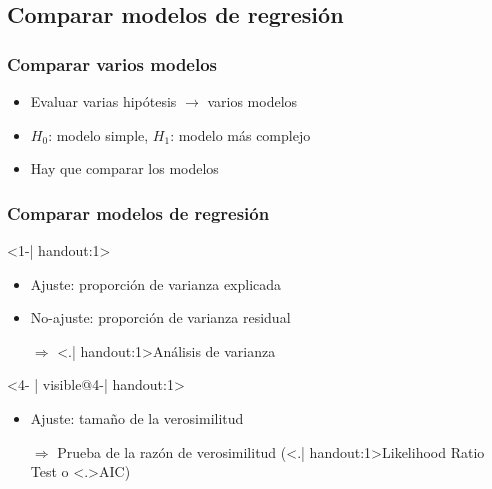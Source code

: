 \documentclass[gray,handout,mathserif]{beamer}
\begin{document}
 
\subsection[Comparaci\'on de modelos]{Comparar modelos de regresi\'on}

\begin{frame}[label=modelcompar]
   \frametitle{Comparar varios modelos}
    \begin{itemize}
      \item Evaluar varias hip\'otesis $\rightarrow$ varios modelos
      \item $H_0$: modelo simple, $H_1$: modelo m\'as complejo
      \item Hay que comparar los modelos
   \end{itemize}
\end{frame}%


\begin{frame}[label=compregrmod1]
   \frametitle{Comparar modelos de regresi\'on}
   \begin{block}{}<1-| handout:1>
      \begin{itemize}[<+-| handout:1>]
         \item Ajuste: proporci\'on de varianza explicada
         \item No-ajuste: proporci\'on de varianza residual
         \item[$\Rightarrow$] \alert<.| handout:1>{An\'alisis de varianza}
      \end{itemize}
   \end{block}
   \begin{block}{}<4- | visible@4-| handout:1>
      \begin{itemize}[<+-| handout:1>]
         \item Ajuste: tama\~no de la verosimilitud
         \item[$\Rightarrow$] Prueba de la raz\'on de verosimilitud (\alert<.| handout:1>{Likelihood Ratio Test} o \alert<.>{AIC})
      \end{itemize}
   \end{block}
\end{frame}%
\end{document}
